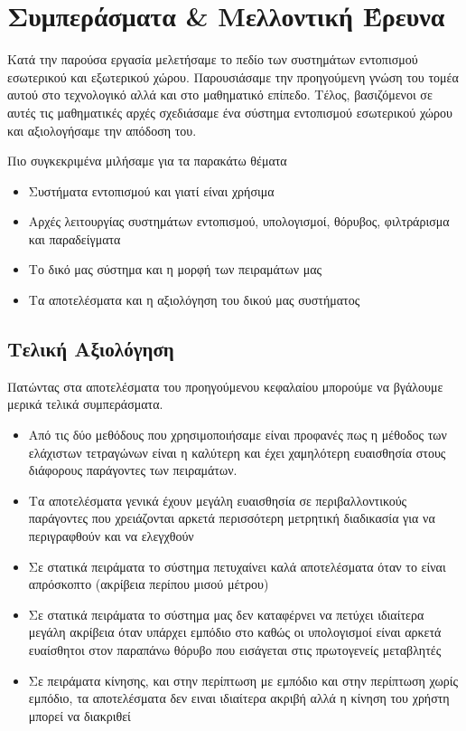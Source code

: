 \chapter{Συμπεράσματα \& Μελλοντική Έρευνα}
Κατά την παρούσα εργασία μελετήσαμε το πεδίο των συστημάτων εντοπισμού εσωτερικού και εξωτερικού
χώρου. Παρουσιάσαμε την προηγούμενη γνώση του τομέα αυτού στο τεχνολογικό αλλά και στο μαθηματικό
επίπεδο. Τέλος, βασιζόμενοι σε αυτές τις μαθηματικές αρχές σχεδιάσαμε ένα σύστημα εντοπισμού
εσωτερικού χώρου και αξιολογήσαμε την απόδοση του.

Πιο συγκεκριμένα μιλήσαμε για τα παρακάτω θέματα
\begin{itemize}
    \item Συστήματα εντοπισμού και γιατί είναι χρήσιμα
    \item Αρχές λειτουργίας συστημάτων εντοπισμού, υπολογισμοί, θόρυβος, φιλτράρισμα και παραδείγματα
    \item Το δικό μας σύστημα και η μορφή των πειραμάτων μας
    \item Τα αποτελέσματα και η αξιολόγηση του δικού μας συστήματος
\end{itemize}

\section{Τελική Αξιολόγηση}
Πατώντας στα αποτελέσματα του προηγούμενου κεφαλαίου μπορούμε να βγάλουμε μερικά
τελικά συμπεράσματα.

\begin{itemize}
\item Από τις δύο μεθόδους που χρησιμοποιήσαμε είναι προφανές πως η μέθοδος των
ελάχιστων τετραγώνων είναι η καλύτερη και έχει χαμηλότερη ευαισθησία στους διάφορους παράγοντες
των πειραμάτων.
\item Τα αποτελέσματα γενικά έχουν μεγάλη ευαισθησία σε περιβαλλοντικούς παράγοντες που χρειάζονται αρκετά περισσότερη μετρητική διαδικασία
για να περιγραφθούν και να ελεγχθούν
\item Σε στατικά πειράματα το σύστημα πετυχαίνει καλά αποτελέσματα όταν το  είναι απρόσκοπτο (ακρίβεια περίπου μισού μέτρου)
\item Σε στατικά πειράματα το σύστημα μας δεν καταφέρνει να πετύχει ιδιαίτερα μεγάλη ακρίβεια όταν υπάρχει εμπόδιο στο
 καθώς οι υπολογισμοί είναι αρκετά ευαίσθητοι στον παραπάνω θόρυβο που εισάγεται στις πρωτογενείς μεταβλητές
\item Σε πειράματα κίνησης, και στην περίπτωση με εμπόδιο και στην περίπτωση χωρίς εμπόδιο, τα αποτελέσματα δεν ειναι ιδιαίτερα ακριβή
αλλά η κίνηση του χρήστη μπορεί να διακριθεί
\end{itemize}

